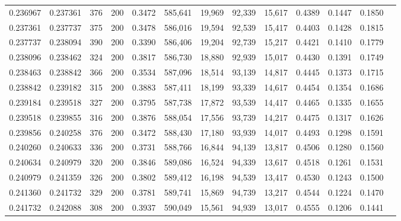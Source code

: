 \begin{tabular}{rrrrrrrrrrrrr}
0.236967 & 0.237361 &    376 & 200 &                                     0.3472 & 585,641 &  19,969 &  92,339 &  15,617 & 0.4389 & 0.1447 & 0.1850 \\
0.237361 & 0.237737 &    375 & 200 &                                     0.3478 & 586,016 &  19,594 &  92,539 &  15,417 & 0.4403 & 0.1428 & 0.1815 \\
0.237737 & 0.238094 &    390 & 200 &                                     0.3390 & 586,406 &  19,204 &  92,739 &  15,217 & 0.4421 & 0.1410 & 0.1779 \\
0.238096 & 0.238462 &    324 & 200 &                                     0.3817 & 586,730 &  18,880 &  92,939 &  15,017 & 0.4430 & 0.1391 & 0.1749 \\
0.238463 & 0.238842 &    366 & 200 &                                     0.3534 & 587,096 &  18,514 &  93,139 &  14,817 & 0.4445 & 0.1373 & 0.1715 \\
0.238842 & 0.239182 &    315 & 200 &                                     0.3883 & 587,411 &  18,199 &  93,339 &  14,617 & 0.4454 & 0.1354 & 0.1686 \\
0.239184 & 0.239518 &    327 & 200 &                                     0.3795 & 587,738 &  17,872 &  93,539 &  14,417 & 0.4465 & 0.1335 & 0.1655 \\
0.239518 & 0.239855 &    316 & 200 &                                     0.3876 & 588,054 &  17,556 &  93,739 &  14,217 & 0.4475 & 0.1317 & 0.1626 \\
0.239856 & 0.240258 &    376 & 200 &                                     0.3472 & 588,430 &  17,180 &  93,939 &  14,017 & 0.4493 & 0.1298 & 0.1591 \\
0.240260 & 0.240633 &    336 & 200 &                                     0.3731 & 588,766 &  16,844 &  94,139 &  13,817 & 0.4506 & 0.1280 & 0.1560 \\
0.240634 & 0.240979 &    320 & 200 &                                     0.3846 & 589,086 &  16,524 &  94,339 &  13,617 & 0.4518 & 0.1261 & 0.1531 \\
0.240979 & 0.241359 &    326 & 200 &                                     0.3802 & 589,412 &  16,198 &  94,539 &  13,417 & 0.4530 & 0.1243 & 0.1500 \\
0.241360 & 0.241732 &    329 & 200 &                                     0.3781 & 589,741 &  15,869 &  94,739 &  13,217 & 0.4544 & 0.1224 & 0.1470 \\
0.241732 & 0.242088 &    308 & 200 &                                     0.3937 & 590,049 &  15,561 &  94,939 &  13,017 & 0.4555 & 0.1206 & 0.1441 \\

\end{tabular}
